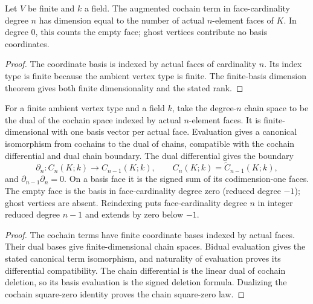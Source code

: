 \begin{lemma}\label{lem:cochain-finite-dim}
Let $V$ be finite and $k$ a field. The augmented cochain term in
face-cardinality degree $n$ has dimension equal to the number of actual
$n$-element faces of $K$. In degree $0$, this counts the empty face; ghost
vertices contribute no basis coordinates.
\leanok
\end{lemma}
\begin{proof}
The coordinate basis is indexed by actual faces of cardinality $n$. Its index
type is finite because the ambient vertex type is finite. The finite-basis
dimension theorem gives both finite dimensionality and the stated rank.
\end{proof}

\begin{lemma}\label{lem:augmented-chain-complex}
For a finite ambient vertex type and a field $k$, take the degree-$n$ chain
space to be the dual of the cochain space indexed by actual $n$-element faces.
It is finite-dimensional with one basis vector per actual face. Evaluation
gives a canonical isomorphism from cochains to the dual of chains, compatible
with the cochain differential and dual chain boundary. The dual differential
gives the boundary
\[
 \partial_n : C_n(K;k)\longrightarrow C_{n-1}(K;k),
 \qquad C_n(K;k)=\widetilde C_{n-1}(K;k),
\]
and $\partial_{n-1}\partial_n=0$. On a basis face it is the signed sum of
its codimension-one faces. The empty face is the basis in face-cardinality
degree zero (reduced degree $-1$); ghost vertices are absent. Reindexing
puts face-cardinality degree $n$ in integer reduced degree $n-1$ and extends
by zero below $-1$.
\leanok
\end{lemma}
\begin{proof}
The cochain terms have finite coordinate bases indexed by actual faces. Their
dual bases give finite-dimensional chain spaces. Bidual evaluation gives the
stated canonical term isomorphism, and naturality of evaluation proves its
differential compatibility. The chain differential is the linear dual of
cochain deletion, so its basis evaluation is the signed deletion formula.
Dualizing the cochain square-zero identity proves the chain square-zero law.
\end{proof}


